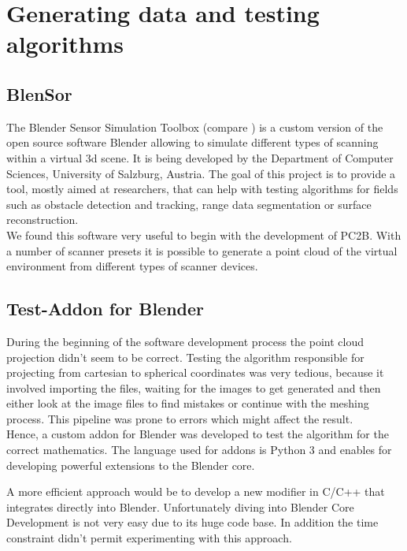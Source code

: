 \pagebreak


\section{Generating data and testing algorithms}

\subsection{BlenSor}

The Blender Sensor Simulation Toolbox (compare \parencite{Gschwandtner11b}) is a custom version of the open source software Blender allowing to simulate different types of scanning within a virtual 3d scene. It is being developed by the Department of Computer Sciences, University of Salzburg, Austria. The goal of this project is to provide a tool, mostly aimed at researchers, that can help with testing algorithms for fields such as obstacle detection and tracking, range data segmentation or surface reconstruction.\\
We found this software very useful to begin with the development of PC2B. With a number of scanner presets it is possible to generate a point cloud of the virtual environment from different types of scanner devices.

\subsection{Test-Addon for Blender}

During the beginning of the software development process the point cloud projection didn't seem to be correct. Testing the algorithm responsible for projecting from cartesian to spherical coordinates was very tedious, because it involved importing the files, waiting for the images to get generated and then either look at the image files to find mistakes or continue with the meshing process. This pipeline was prone to errors which might affect the result.\\
Hence, a custom addon for Blender was developed to test the algorithm for the correct mathematics. The language used for addons is Python 3 and enables for developing powerful extensions to the Blender core.

A more efficient approach would be to develop a new modifier in C/C++ that integrates directly into Blender. Unfortunately diving into Blender Core Development is not very easy due to its huge code base. In addition the time constraint didn't permit experimenting with this approach.


